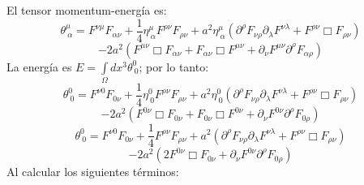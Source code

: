 \documentclass[a4paper,12pt]{article}
\begin{document}
El tensor momentum-energía es:
\begin{equation}
\theta^\mu_{\ \alpha}=F^{\nu\mu}F_{\alpha\nu}+\frac{1}{4}\eta^\mu_{\ \alpha}F^{\rho\nu}F_{\rho\nu}+a^2\eta^\mu_{\ \alpha}(\partial^\rho F_{\nu\rho}\partial_\lambda F^{\nu\lambda}+F^{\rho\nu}\Box F_{\rho\nu})
\end{equation}
$$-2a^2(F^{\mu\nu}\Box F_{\alpha\nu}+F_{\alpha\nu}\Box F^{\mu\nu}+\partial_\nu F^{\mu\nu}\partial^\rho F_{\alpha\rho}) $$
La energía es $E=\int\limits_{\Omega}dx^{3}\theta^{0}_{\ 0}$; por lo tanto:
\begin{equation}
\theta^0_{\ 0}=F^{\nu0}F_{0\nu}+\frac{1}{4}\eta^0_{\ 0}F^{\rho\nu}F_{\rho\nu}+a^2\eta^0_{\ 0}(\partial^\rho F_{\nu\rho}\partial_\lambda F^{\nu\lambda}+F^{\rho\nu}\Box F_{\rho\nu})
\end{equation}
$$-2a^2(F^{0\nu}\Box F_{0\nu}+F_{0\nu}\Box F^{0\nu}+\partial_\nu F^{0\nu}\partial^\rho F_{0\rho}) $$
\begin{equation}
\theta^0_{\ 0}=F^{\nu0}F_{0\nu}+\frac{1}{4}F^{\rho\nu}F_{\rho\nu}+a^2(\partial^\rho F_{\nu\rho}\partial_\lambda F^{\nu\lambda}+F^{\rho\nu}\Box F_{\rho\nu})
\end{equation}
$$-2a^2(2F^{0\nu}\Box F_{0\nu}+\partial_\nu F^{0\nu}\partial^\rho F_{0\rho}) $$
Al calcular los siguientes términos:
\end{document}
